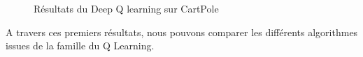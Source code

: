 \begin{figure}[H]
\begin{minipage}{.5\linewidth}
\centering
{}
\end{minipage}%
\begin{minipage}{.5\linewidth}
\centering
{}
\end{minipage}\par\medskip
\caption{Résultats du Deep Q learning sur CartPole}
\label{fig:main}
\end{figure}

A travers ces premiers résultats, nous pouvons comparer les différents algorithmes issues de la famille du Q Learning.

